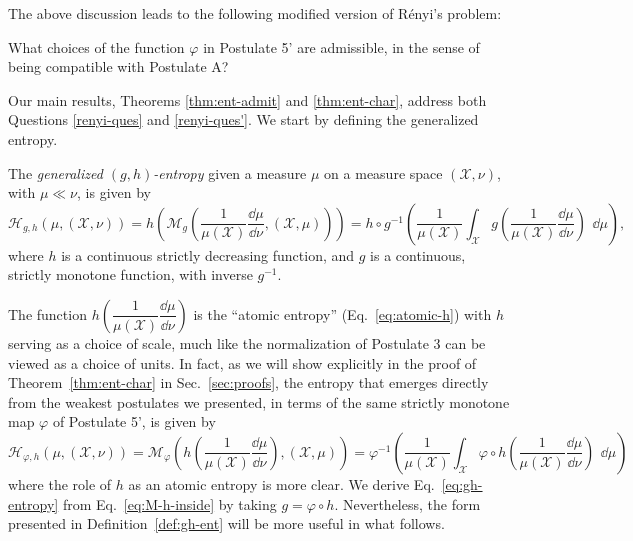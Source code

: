 \documentclass[reqno]{amsart}
\begin{document}
The above discussion leads to the following modified version of Rényi's problem:
\begin{ques}
\label{renyi-ques'}
    \rm What choices of the function $\varphi$ in Postulate 5' are admissible, in the sense of being compatible with Postulate A?
\end{ques}


Our main results, Theorems \ref{thm:ent-admit} and \ref{thm:ent-char}, address both Questions \ref{renyi-ques} and \ref{renyi-ques'}.
We start by defining the generalized entropy.


\begin{definition}
\label{def:gh-ent}
The {\it generalized $(g,h)$-entropy} given a measure $\mu$ on a measure space $(\mathcal{X}, \nu)$, with $\mu \ll \nu$,  is given by 
\begin{equation}
 \label{eq:gh-entropy}
\mathcal{H}_{g,h}(\mu, (\mathcal{X}, \nu)) =  h \left( \mathcal{M}_g \left(\dfrac{1}{\mu(\mathcal{X}) } \dfrac{\dd \mu}{\dd \nu}, (\mathcal{X}, \mu) \right) \right)  
=   h \circ g^{-1}\left(   \dfrac{1}{\mu(\mathcal{X})} \int_\mathcal{X}  g  \left(\dfrac{1}{\mu(\mathcal{X})}\dfrac{\dd \mu}{\dd \nu} \right) \ \, \dd \mu \right) , 
\end{equation}
where $h$ is a continuous strictly decreasing function, and $g$  is a continuous, strictly monotone function, with inverse $g^{-1}$.
\end{definition}



\begin{remark}
The function $h\left(\dfrac{1}{\mu(\mathcal{X}) } \dfrac{\dd \mu}{\dd \nu}\right)$ is the ``atomic entropy'' (Eq.~\ref{eq:atomic-h}) with $h$ serving as a choice of scale,  much like the normalization of Postulate 3 can be viewed as a choice of units.
In fact, as we will show explicitly in the proof of Theorem~\ref{thm:ent-char}  in Sec.~\ref{sec:proofs}, the entropy that emerges directly from the weakest postulates we presented, in terms of the same strictly monotone map $\varphi$ of Postulate 5', is given by
\begin{equation}
\label{eq:M-h-inside}
\mathcal{H}_{\varphi,h}(\mu, (\mathcal{X}, \nu)) =  \mathcal{M}_\varphi \left(h\left(\dfrac{1}{\mu(\mathcal{X}) } \dfrac{\dd \mu}{\dd \nu}\right), (\mathcal{X}, \mu) \right)  
=
 \varphi^{-1}\left(   \dfrac{1}{\mu(\mathcal{X})} \int_\mathcal{X}  \varphi \circ h  \left(\dfrac{1}{\mu(\mathcal{X})}\dfrac{\dd \mu}{\dd \nu} \right) \ \, \dd \mu \right)
\end{equation}
where the role of $h$ as an atomic entropy is more clear. We derive Eq.~\eqref{eq:gh-entropy} from Eq.~\eqref{eq:M-h-inside} by taking  $g = \varphi \circ h$.
Nevertheless, the form presented in Definition~\ref{def:gh-ent} will be more useful in what follows.
\end{remark}
\end{document}
